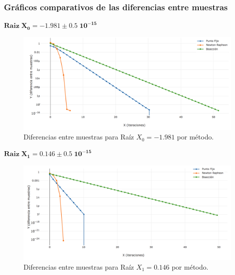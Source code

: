 \documentclass[10pt,a4paper]{article}
\begin{document}
\subsubsection{Gráficos comparativos de las diferencias entre muestras}
\vspace{10pt}

$\mathbf{Raiz\;X_{0} = -1.981 \pm0.5\;10^{-15}}$

\begin{figure}[H]
\begin{centering}
\includegraphics[width=15cm]{ej2-r1.png}
\end{centering}
\caption{Diferencias entre muestras para Raíz $X_{0}= -1.981$ por método.}
\end{figure}


$\mathbf{Raiz\; X_{1} =0.146 \pm0.5\;10^{-15}}$
\begin{figure}[H]
\begin{centering}
\includegraphics[width=15cm]{ej2-r2.png}
\end{centering}
\caption{Diferencias entre muestras para Raíz $X_{1}= 0.146$ por método.}
\end{figure}
\end{document}
